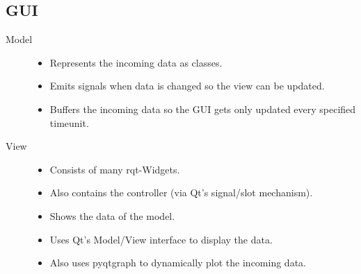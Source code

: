 \subsection{GUI}

\begin{description}
	\item[Model] \mbox{}	
		\begin{itemize}
		\item Represents the incoming data as classes.
		\item Emits signals when data is changed so the view can be updated.
		\item Buffers the incoming data so the GUI gets only updated every specified timeunit.
		\end{itemize}
	\item[View] \mbox{}
		\begin{itemize}
		\item Consists of many rqt-Widgets.
		\item Also contains the controller (via Qt's signal/slot mechanism).
		\item Shows the data of the model.
		\item Uses Qt's Model/View interface to display the data.
		\item Also uses pyqtgraph to dynamically plot the incoming data.
		\end{itemize}
\end{description}